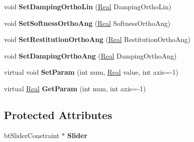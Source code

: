 \begin{DoxyCompactItemize}
\item 
\hypertarget{classphys_1_1SliderConstraint_aa41383cdebe8c6343d5b16fecaebdc35}{
void {\bfseries SetDampingOrthoLin} (\hyperlink{namespacephys_af7eb897198d265b8e868f45240230d5f}{Real} DampingOrthoLin)}
\label{dc/d72/classphys_1_1SliderConstraint_aa41383cdebe8c6343d5b16fecaebdc35}

\item 
\hypertarget{classphys_1_1SliderConstraint_a4efe57a9656ad1686b3aff2b2f9643d0}{
void {\bfseries SetSoftnessOrthoAng} (\hyperlink{namespacephys_af7eb897198d265b8e868f45240230d5f}{Real} SoftnessOrthoAng)}
\label{dc/d72/classphys_1_1SliderConstraint_a4efe57a9656ad1686b3aff2b2f9643d0}

\item 
\hypertarget{classphys_1_1SliderConstraint_ada0a9eab21ef9ac48d711cb67c69a989}{
void {\bfseries SetRestitutionOrthoAng} (\hyperlink{namespacephys_af7eb897198d265b8e868f45240230d5f}{Real} RestitutionOrthoAng)}
\label{dc/d72/classphys_1_1SliderConstraint_ada0a9eab21ef9ac48d711cb67c69a989}

\item 
\hypertarget{classphys_1_1SliderConstraint_a85e6748c60d9b036bf53033233067586}{
void {\bfseries SetDampingOrthoAng} (\hyperlink{namespacephys_af7eb897198d265b8e868f45240230d5f}{Real} DampingOrthoAng)}
\label{dc/d72/classphys_1_1SliderConstraint_a85e6748c60d9b036bf53033233067586}

\item 
\hypertarget{classphys_1_1SliderConstraint_a1516aeff86674a969411b17a1847d115}{
virtual void {\bfseries SetParam} (int num, \hyperlink{namespacephys_af7eb897198d265b8e868f45240230d5f}{Real} value, int axis=-\/1)}
\label{dc/d72/classphys_1_1SliderConstraint_a1516aeff86674a969411b17a1847d115}

\item 
\hypertarget{classphys_1_1SliderConstraint_a181393c2beec42bdebf7d1a17dfe7593}{
virtual \hyperlink{namespacephys_af7eb897198d265b8e868f45240230d5f}{Real} {\bfseries GetParam} (int num, int axis=-\/1)}
\label{dc/d72/classphys_1_1SliderConstraint_a181393c2beec42bdebf7d1a17dfe7593}

\end{DoxyCompactItemize}
\subsection*{Protected Attributes}
\begin{DoxyCompactItemize}
\item 
\hypertarget{classphys_1_1SliderConstraint_ae99629f3e87f72d3271ff82137fa81e2}{
btSliderConstraint $\ast$ {\bfseries Slider}}
\label{dc/d72/classphys_1_1SliderConstraint_ae99629f3e87f72d3271ff82137fa81e2}

\end{DoxyCompactItemize}


